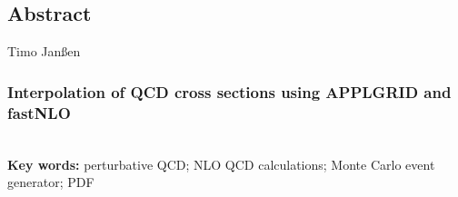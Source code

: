 
%
%
%
\subsection*{Abstract}

Timo Janßen
\subsubsection*{Interpolation of QCD cross sections using APPLGRID and fastNLO}


%
\mbox{}\\[0.5\baselineskip]\noindent
\textbf{Key words:} 
perturbative QCD; NLO QCD calculations; Monte Carlo event generator; PDF
